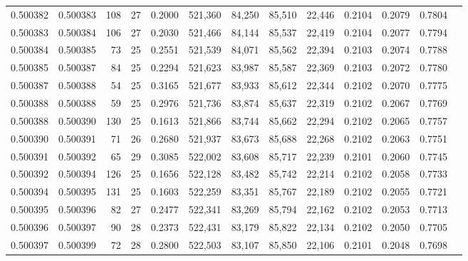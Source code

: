 \begin{tabular}{rrrrrrrrrrrrr}
0.500382 & 0.500383 & 108 &  27 &                                     0.2000 & 521,360 &  84,250 &  85,510 &  22,446 & 0.2104 & 0.2079 & 0.7804 \\
0.500383 & 0.500384 & 106 &  27 &                                     0.2030 & 521,466 &  84,144 &  85,537 &  22,419 & 0.2104 & 0.2077 & 0.7794 \\
0.500384 & 0.500385 &  73 &  25 &                                     0.2551 & 521,539 &  84,071 &  85,562 &  22,394 & 0.2103 & 0.2074 & 0.7788 \\
0.500385 & 0.500387 &  84 &  25 &                                     0.2294 & 521,623 &  83,987 &  85,587 &  22,369 & 0.2103 & 0.2072 & 0.7780 \\
0.500387 & 0.500388 &  54 &  25 &                                     0.3165 & 521,677 &  83,933 &  85,612 &  22,344 & 0.2102 & 0.2070 & 0.7775 \\
0.500388 & 0.500388 &  59 &  25 &                                     0.2976 & 521,736 &  83,874 &  85,637 &  22,319 & 0.2102 & 0.2067 & 0.7769 \\
0.500388 & 0.500390 & 130 &  25 &                                     0.1613 & 521,866 &  83,744 &  85,662 &  22,294 & 0.2102 & 0.2065 & 0.7757 \\
0.500390 & 0.500391 &  71 &  26 &                                     0.2680 & 521,937 &  83,673 &  85,688 &  22,268 & 0.2102 & 0.2063 & 0.7751 \\
0.500391 & 0.500392 &  65 &  29 &                                     0.3085 & 522,002 &  83,608 &  85,717 &  22,239 & 0.2101 & 0.2060 & 0.7745 \\
0.500392 & 0.500394 & 126 &  25 &                                     0.1656 & 522,128 &  83,482 &  85,742 &  22,214 & 0.2102 & 0.2058 & 0.7733 \\
0.500394 & 0.500395 & 131 &  25 &                                     0.1603 & 522,259 &  83,351 &  85,767 &  22,189 & 0.2102 & 0.2055 & 0.7721 \\
0.500395 & 0.500396 &  82 &  27 &                                     0.2477 & 522,341 &  83,269 &  85,794 &  22,162 & 0.2102 & 0.2053 & 0.7713 \\
0.500396 & 0.500397 &  90 &  28 &                                     0.2373 & 522,431 &  83,179 &  85,822 &  22,134 & 0.2102 & 0.2050 & 0.7705 \\
0.500397 & 0.500399 &  72 &  28 &                                     0.2800 & 522,503 &  83,107 &  85,850 &  22,106 & 0.2101 & 0.2048 & 0.7698 \\

\end{tabular}
